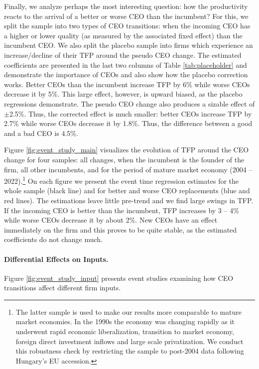 \documentclass[11pt,a4paper]{article}
\begin{document}
Finally, we analyze perhaps the most interesting question: how the productivity reacts to the arrival of a better or worse CEO than the incumbent? For this, we split the sample into two types of CEO transitions: when the incoming CEO has a higher or lower quality (as measured by the associated fixed effect) than the incumbent CEO. We also split the placebo sample into firms which experience an increase/decline of their TFP around the pseudo CEO change. The estimated coefficients are presented in the last two columns of Table \ref{tab:placeholder} and demonstrate the importance of CEOs and also show how the placebo correction works. Better CEOs than the incumbent increase TFP by 6\% while worse CEOs decrease it by 5\%. This large effect, however, is upward biased, as the placebo regressions demonstrate. The pseudo CEO change also produces a sizable effect of $\pm$2.5\%. Thus, the corrected effect is much smaller: better CEOs increase TFP by 2.7\% while worse CEOs decrease it by 1.8\%. Thus, the difference between a good and a bad CEO is 4.5\%. 

Figure \ref{fig:event_study_main} visualizes the evolution of TFP around the CEO change for four samples: all changes, when the incumbent is the founder of the firm, all other incumbents, and for the period of mature market economy (2004 -- 2022).\footnote{The latter sample is used to make our results more comparable to mature market economies. In the 1990s the economy was changing rapidly as it underwent rapid economic liberalization, transition to market economy, foreign direct investment inflows and large scale privatization. We conduct this robustness check by restricting the sample to post-2004 data following Hungary's EU accession.} On each figure we present the event time regression estimates for the whole sample (black line) and for better and worse CEO replacements (blue and red lines). The estimations leave little pre-trend and we find large swings in TFP. If the incoming CEO is better than the incumbent, TFP increases by 3 -- 4\% while worse CEOs decrease it by about 2\%. New CEOs have an effect immediately on the firm and this proves to be quite stable, as the estimated coefficients do not change much.  



\paragraph{Differential Effects on Inputs.} Figure \ref{fig:event_study_input} presents event studies examining how CEO transitions affect different firm inputs.
\end{document}
